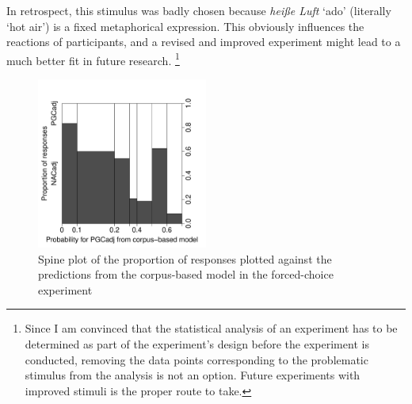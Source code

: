 \begin{exe}
\end{exe}

In retrospect, this stimulus was badly chosen because \textit{heiße Luft} `ado' (literally `hot air') is a fixed metaphorical expression.
This obviously influences the reactions of participants, and a revised and improved experiment might lead to a much better fit in future research.%
\footnote{Since I am convinced that the statistical analysis of an experiment has to be determined as part of the experiment's design before the experiment is conducted, removing the data points corresponding to the problematic stimulus from the analysis is not an option.
Future experiments with improved stimuli is the proper route to take.}

\begin{figure}[htbp!]
  \centering
  \includegraphics[width=0.5\textwidth]{../R/output/fc_proportions}
  \caption{Spine plot of the proportion of responses plotted against the predictions from the corpus-based model in the forced-choice experiment}
  \label{fig:spines}
\end{figure}

